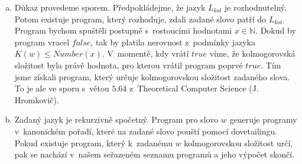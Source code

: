 \documentclass[a4paper]{article}
\begin{document}
\begin{enumerate}[(a)]
    \item Důkaz provedeme sporem. Předpokládejme, že jazyk $L_{kol}$ je rozhodnutelný. Potom existuje program, který rozhoduje, zdali zadané slovo patří do $L_{kol}$. Program bychom spuštěli postupně s~rostoucími hodnotami $x \in \mathbb{N}$. Dokud by program vracel $\mathit{false}$, tak by platila nerovnost z~podmínky jazyka $K(w) \leq  Number(x)$. V~momentě, kdy vrátí $\mathit{true}$ víme, že kolmogorovská složitost byla právě hodnota, pro kterou vrátil program poprvé $\mathit{true}$. Tím jsme získali program, který určuje kolmogorovskou složitost zadaného slova. To je ale ve sporu s~větou  $5.64$ z~Theoretical Computer Science (J. Hromkovič).
    \item Zadaný jazyk je rekurzivně spočetný. Program pro slovo $w$ generuje programy v~kanonickém pořadí, které na zadané slovo pouští pomocí dovetailingu. Pokud existuje program, který k~zadanému $w$ kolmogorovskou složitost určí, pak se nachází v~našem seřazeném seznamu programů a jeho výpočet skončí.
\end{enumerate}
\end{document}
